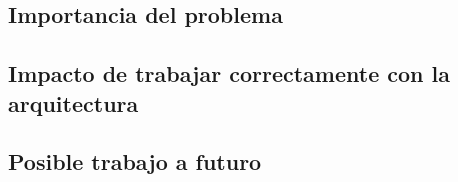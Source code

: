 
\subsection{Importancia del problema}
\subsection{Impacto de trabajar correctamente con la arquitectura}
\subsection{Posible trabajo a futuro}
